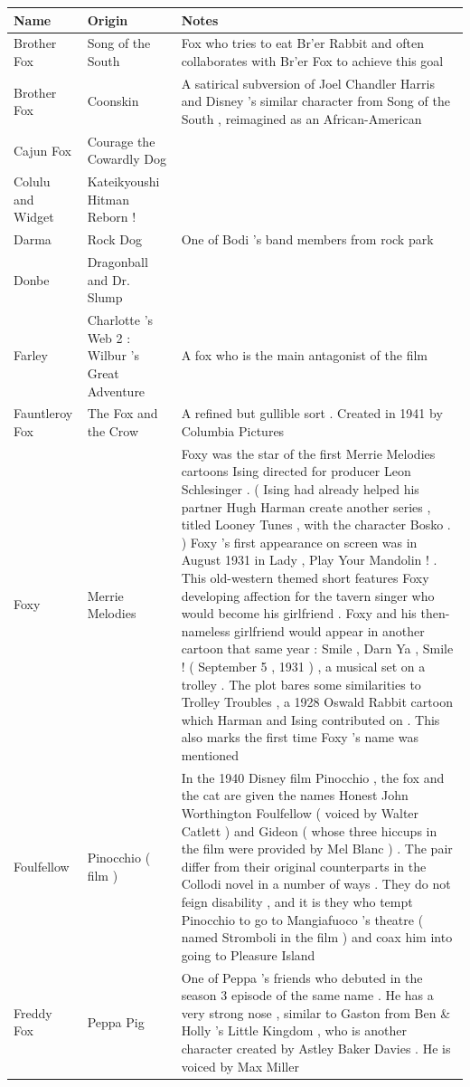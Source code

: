 \documentclass{article}
\begin{document}
\begin{tabular}{lll}
\toprule
Name & Origin & Notes \\
\midrule
Brother Fox & Song of the South & Fox who tries to eat Br'er Rabbit and often collaborates with Br'er Fox to achieve this goal \\
Brother Fox & Coonskin & A satirical subversion of Joel Chandler Harris and Disney 's similar character from Song of the South , reimagined as an African-American \\
Cajun Fox & Courage the Cowardly Dog &  \\
Colulu and Widget & Kateikyoushi Hitman Reborn ! &  \\
Darma & Rock Dog & One of Bodi 's band members from rock park \\
Donbe & Dragonball and Dr. Slump &  \\
Farley & Charlotte 's Web 2 : Wilbur 's Great Adventure & A fox who is the main antagonist of the film \\
Fauntleroy Fox & The Fox and the Crow & A refined but gullible sort . Created in 1941 by Columbia Pictures \\
Foxy & Merrie Melodies & Foxy was the star of the first Merrie Melodies cartoons Ising directed for producer Leon Schlesinger . ( Ising had already helped his partner Hugh Harman create another series , titled Looney Tunes , with the character Bosko . ) Foxy 's first appearance on screen was in August 1931 in Lady , Play Your Mandolin ! . This old-western themed short features Foxy developing affection for the tavern singer who would become his girlfriend . Foxy and his then-nameless girlfriend would appear in another cartoon that same year : Smile , Darn Ya , Smile ! ( September 5 , 1931 ) , a musical set on a trolley . The plot bares some similarities to Trolley Troubles , a 1928 Oswald Rabbit cartoon which Harman and Ising contributed on . This also marks the first time Foxy 's name was mentioned \\
Foulfellow & Pinocchio ( film ) & In the 1940 Disney film Pinocchio , the fox and the cat are given the names Honest John Worthington Foulfellow ( voiced by Walter Catlett ) and Gideon ( whose three hiccups in the film were provided by Mel Blanc ) . The pair differ from their original counterparts in the Collodi novel in a number of ways . They do not feign disability , and it is they who tempt Pinocchio to go to Mangiafuoco 's theatre ( named Stromboli in the film ) and coax him into going to Pleasure Island \\
Freddy Fox & Peppa Pig & One of Peppa 's friends who debuted in the season 3 episode of the same name . He has a very strong nose , similar to Gaston from Ben \& Holly 's Little Kingdom , who is another character created by Astley Baker Davies . He is voiced by Max Miller \\

\end{tabular}
\end{document}

